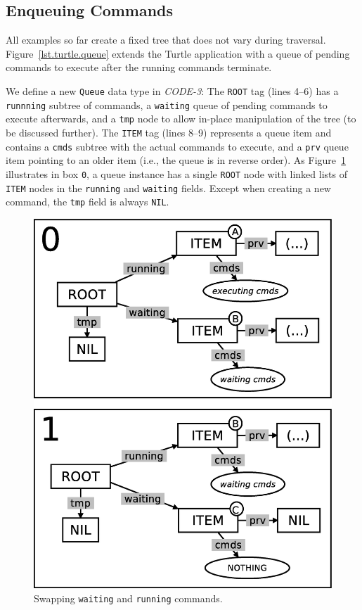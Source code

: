 \documentclass{sig-alternate}
\newcommand{\code}[1] {{\small{\texttt{#1}}}}
\begin{document}
\subsection{Enqueuing Commands}
\label{sub.enqueuing}

All examples so far create a fixed tree that does not vary during traversal.
%
Figure~\ref{lst.turtle.queue} extends the Turtle application with a queue of 
pending commands to execute after the running commands terminate.

We define a new \code{Queue} data type in \emph{CODE-3}:
The \code{ROOT} tag (lines 4--6) has a \code{runnning} subtree of commands, a 
\code{waiting} queue of pending commands to execute afterwards, and a 
\code{tmp} node to allow in-place manipulation of the tree (to be discussed 
further).
%
The \code{ITEM} tag (lines 8--9) represents a queue item and contains a 
\code{cmds} subtree with the actual commands to execute, and a \code{prv} queue 
item pointing to an older item (i.e., the queue is in reverse order).
%
As Figure~\ref{fig.queue-1} illustrates in box \code{0}, a queue instance has a 
single \code{ROOT} node with linked lists of \code{ITEM} nodes in the 
\code{running} and \code{waiting} fields.
Except when creating a new command, the \code{tmp} field is always \code{NIL}.

\begin{figure}[t]
\centering
\includegraphics[scale=0.24]{queue-fig-1.eps}
\caption{
Swapping \code{waiting} and \code{running} commands.
\label{fig.queue-1}
}
\end{figure}
\end{document}
